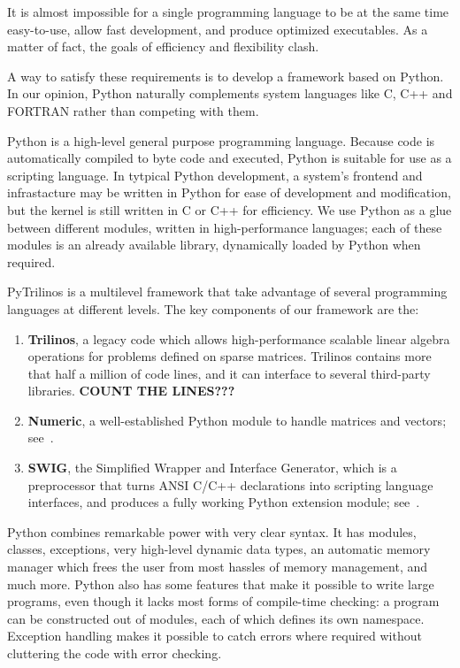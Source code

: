 \documentclass[10pt,relax]{SANDreport}
\begin{document}
It is almost impossible for a single
programming language to be at the same time easy-to-use, allow fast
development, and produce optimized executables. As a matter of fact, the
goals of efficiency and flexibility clash. 

A way to satisfy these requirements is to develop a framework based on Python.
In our opinion, Python naturally complements system
languages like C, C++ and FORTRAN rather than competing with them.

Python is a high-level general purpose programming language. Because code is
automatically compiled to byte code and executed, Python is suitable for use
as a scripting language.  In tytpical Python development, a system's frontend
and infrastacture may be written in Python for ease of development and
modification, but the kernel is still written in C or C++ for efficiency.  We
use Python as a glue between different modules, written in high-performance
languages; each of these modules is an already available library, dynamically
loaded by Python when required.

PyTrilinos is a multilevel framework that take advantage of several
programming languages at different levels. 
The key components of our framework are the:
\begin{enumerate}
\item {\bf Trilinos}, a legacy code which allows high-performance scalable
linear algebra operations for problems defined on sparse matrices. Trilinos
contains more that half a million of code lines, and it can interface to
several third-party libraries. 
{\bf COUNT THE LINES???}

\item {\bf Numeric}, a well-established Python module to handle matrices and
vectors; see~\cite{numeric}.
\item {\bf SWIG}, the Simplified Wrapper and Interface Generator, which
is a  preprocessor
that turns ANSI C/C++ declarations into scripting language interfaces, and
produces a fully working Python extension module; see~\cite{swig}.
\end{enumerate}

Python combines remarkable power with very clear syntax. It has modules,
  classes, exceptions, very high-level dynamic data types, an automatic
  memory manager which frees the user from most hassles of memory management,
  and much more. Python also has some features that make it possible to write
  large programs, even though it lacks most forms of compile-time checking: a
  program can be constructed out of modules, each of which defines its own
  namespace. Exception handling makes it possible to catch errors where
  required without cluttering the code with error checking. 
\end{document}
